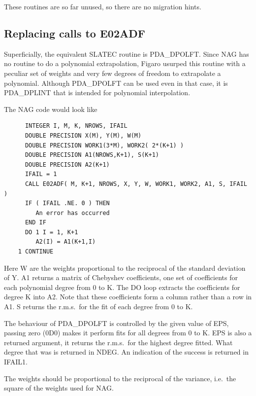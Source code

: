 \documentclass[11pt,twoside]{article}
\newcommand{\htmlref}[2]{#1}
\newcommand{\xlabel}[1]{}
\begin{document}
   These routines are so far unused, so there are no migration hints.


\subsection{\xlabel{replacing_calls_to_e02adf}\label{m_e02adf}Replacing calls to E02ADF}

   Superficially, the equivalent SLATEC routine is
\htmlref{PDA\_DPOLFT.}{PDA\_DPOLFT}
   Since NAG
   has no routine to do a polynomial extrapolation,
   Figaro usurped this routine with a peculiar set of weights
   and very few degrees of freedom to extrapolate a polynomial. Although
   PDA\_DPOLFT can be used even in that case, it is
\htmlref{PDA\_DPLINT}{PDA\_DPLINT}
   that is
   intended for polynomial interpolation.

   The NAG code would look like

\begin{verbatim}
      INTEGER I, M, K, NROWS, IFAIL
      DOUBLE PRECISION X(M), Y(M), W(M)
      DOUBLE PRECISION WORK1(3*M), WORK2( 2*(K+1) )
      DOUBLE PRECISION A1(NROWS,K+1), S(K+1)
      DOUBLE PRECISION A2(K+1)
      IFAIL = 1
      CALL E02ADF( M, K+1, NROWS, X, Y, W, WORK1, WORK2, A1, S, IFAIL )
      IF ( IFAIL .NE. 0 ) THEN
         An error has occurred
      END IF
      DO 1 I = 1, K+1
         A2(I) = A1(K+1,I)
    1 CONTINUE
\end{verbatim}

   Here W are the weights proportional to the reciprocal of the standard
   deviation of Y. A1 returns a matrix of Chebyshev coefficients, one
   set of coefficients for each polynomial degree from 0 to K. The DO
   loop extracts the coefficients for degree K into A2. Note that these
   coefficients form a column rather than a row in A1. S returns the
   r.m.s.\ for the fit of each degree from 0 to K.

   The behaviour of PDA\_DPOLFT is controlled by the given value of EPS,
   passing zero (0D0) makes it perform fits for all degrees from 0 to K.
   EPS is also a returned argument, it returns the r.m.s.\ for
   the highest degree fitted. What degree that was is returned in NDEG.
   An indication of the success is returned in IFAIL1.

   The weights should be proportional to the reciprocal of the variance,
   i.e.\ the square of the weights used for NAG.
\end{document}
